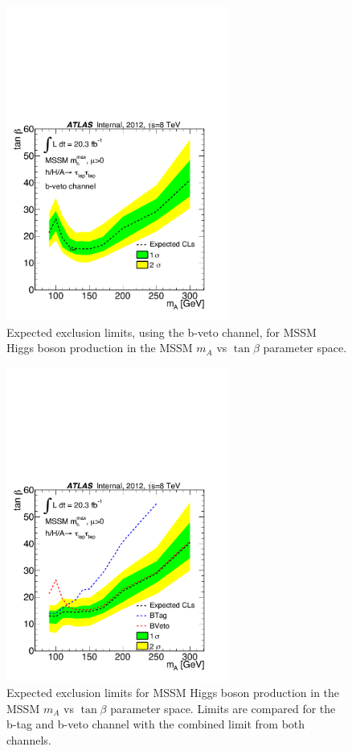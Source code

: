 \begin{figure}[]
  \centering
  \includegraphics[width=0.65\textwidth]{figure/limits/Limits_mAtanBeta_BVeto.pdf}
  \caption{Expected %
  exclusion limits, using the b-veto channel, for MSSM Higgs boson production 
in the MSSM $m_A$ vs $\tan\beta$ parameter space.}
\label{fig:limit_extract_combined3}
\end{figure}

\begin{figure}[]
  \centering
  \includegraphics[width=0.65\textwidth]{figure/limits/Limits_mAtanBeta_CombChannels.pdf}
  \caption{Expected %
  exclusion limits for MSSM Higgs boson production 
in the MSSM $m_A$ vs $\tan\beta$ parameter space. Limits are compared for the b-tag and b-veto channel with the combined limit from both channels.}
\label{fig:limit_extract_combined3}
\end{figure}



\clearpage
